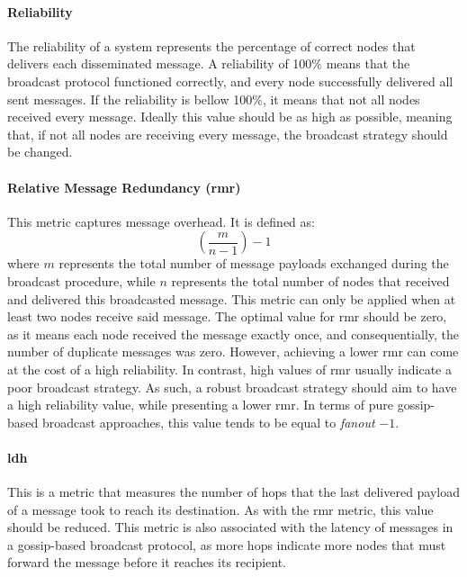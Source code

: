 \paragraph{Reliability} \label{par:reliability} The reliability of a system represents the percentage of correct nodes that delivers each disseminated message. A reliability of 100\% means that the broadcast protocol functioned correctly, and every node successfully delivered all sent messages. If the reliability is bellow 100\%, it means that not all nodes received every message. Ideally this value should be as high as possible, meaning that, if not all nodes are receiving every message, the broadcast strategy should be changed.

\paragraph{Relative Message Redundancy (\gls{rmr})} \label{par:rmr} This metric captures message overhead. It is defined as:
\begin{equation*}
    \left(\frac{m}{n-1}\right) - 1
\end{equation*}
where $m$ represents the total number of message payloads exchanged during the broadcast procedure, while $n$ represents the total number of nodes that received and delivered this broadcasted message. This metric can only be applied when at least two nodes receive said message. The optimal value for \gls{rmr} should be zero, as it means each node received the message exactly once, and consequentially, the number of duplicate messages was zero. However, achieving a lower \gls{rmr} can come at the cost of a high reliability. In contrast, high values of \gls{rmr} usually indicate a poor broadcast strategy. As such, a robust broadcast strategy should aim to have a high reliability value, while presenting a lower \gls{rmr}. In terms of pure gossip-based broadcast approaches, this value tends to be equal to \textit{fanout} $- 1$.

\paragraph{\gls{ldh}} \label{par:ldh} This is a metric that measures the number of hops that the last delivered payload of a message took to reach its destination. As with the \gls{rmr} metric, this value should be reduced. This metric is also associated with the latency of messages in a gossip-based broadcast protocol, as more hops indicate more nodes that must forward the message before it reaches its recipient.


